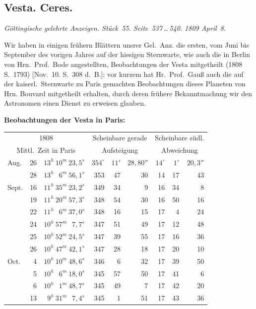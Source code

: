 \documentclass[12pt,a4paper]{book}
\begin{document}
\subsection*{Vesta. Ceres.}

\textit{G\"ottingische gelehrte Anzeigen. St\"uck~55. Seite~537\,\ldots\,540. 1809 April~8.}

Wir haben in einigen fr\"uhern Bl\"attern unsrer Gel.~Anz. die ersten, vom Juni bis September des vorigen Jahres auf der hiesigen Sternwarte, wie auch die in Berlin von Hrn.~Prof.~Bode angestellten, Beobachtungen der Vesta mitgetheilt (1808 S.~1793) [Nov.~10. S.~308 d.~B.]: vor kurzem hat Hr.~Prof.~Gau{\ss} auch die auf der kaiserl.~Sternwarte zu Paris gemachten Beobachtungen dieses Planeten von Hrn. Bouvard mitgetheilt erhalten, durch deren fr\"uhere Bekanntmachung wir den Astronomen einen Dienst zu erweisen glauben.

\textbf{Beobachtungen der Vesta in Paris:}

\begin{small}
\begin{center}
\begin{tabular}{llr@{\hspace{1.5em}}rrr@{\hspace{1.5em}}rrr}
\toprule
\multicolumn{3}{c}{1808} & \multicolumn{3}{c}{Scheinbare gerade} & \multicolumn{3}{c}{Scheinbare s\"udl.} \\
\multicolumn{3}{c}{Mittl.~Zeit in Paris} & \multicolumn{3}{c}{Aufsteigung} & \multicolumn{3}{c}{Abweichung} \\
\midrule
Aug. & 26 & $13^{h}\ 10^{m}\ 23{,}5^{s}$ & $354^{\circ}$ & $11'$ & $28{,}80''$ & $14^{\circ}$ & \phantom{1}$1'$ & $20{,}3''$ \\
& 28 & $13^{h}\ \phantom{1}6^{m}\ 56{,}1^{s}$ & 353 & 47 & 30 & 14 & 17 & 43 \\
Sept. & 16 & $11^{h}\ 35^{m}\ 23{,}2^{s}$ & 349 & 34 & ~9 & 16 & 34 & ~8 \\
& 19 & $11^{h}\ 20^{m}\ 57{,}3^{s}$ & 348 & 54 & 30 & 16 & 50 & 16 \\
& 22 & $11^{h}\ \phantom{1}6^{m}\ 37{,}0^{s}$ & 348 & 16 & 15 & 17 & ~4 & 24 \\
& 24 & $10^{h}\ 57^{m}\ \phantom{0}7{,}7^{s}$ & 347 & 51 & 49 & 17 & 12 & 48 \\
& 25 & $10^{h}\ 52^{m}\ 24{,}5^{s}$ & 347 & 39 & 55 & 17 & 16 & 36 \\
& 26 & $10^{h}\ 47^{m}\ 42{,}1^{s}$ & 347 & 28 & 18 & 17 & 20 & 10 \\
Oct. & ~4 & $10^{h}\ 10^{m}\ 48{,}6^{s}$ & 346 & ~6 & 32 & 17 & 39 & 50 \\
& ~5 & $10^{h}\ \phantom{1}6^{m}\ 18{,}0^{s}$ & 345 & 57 & 50 & 17 & 41 & ~6 \\
& ~6 & $10^{h}\ \phantom{1}1^{m}\ 48{,}7^{s}$ & 345 & 49 & ~7 & 17 & 42 & 20 \\
& 13 & \phantom{$1^{h}$}$9^{h}\ 31^{m}\ \phantom{0}7{,}4^{s}$ & 345 & ~1 & 51 & 17 & 43 & 36 \\
\bottomrule
\end{tabular}
\end{center}
\end{small}
\end{document}
